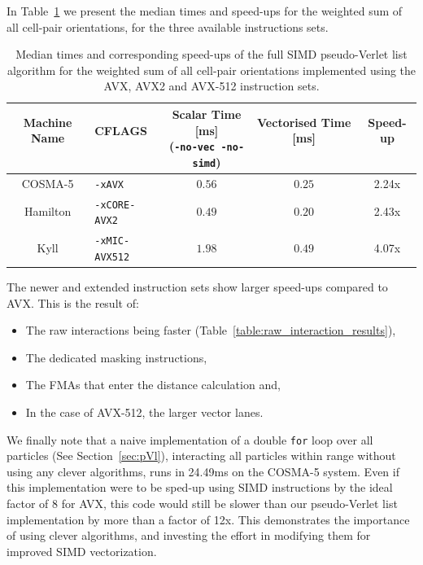 \documentclass{IOS-Book-Article}
\begin{document}
In Table~\ref{table:pseudo_verlet_list_simd_results} we present the median times and speed-ups for the weighted sum of all cell-pair orientations, for the three available instructions sets.

\begin{table}[h]
  \caption{Median times and corresponding speed-ups of the full SIMD pseudo-Verlet list algorithm for the weighted sum of all cell-pair orientations implemented using the AVX, AVX2 and AVX-512 instruction sets.}
  \label{table:pseudo_verlet_list_simd_results}
  \centering
  \begin{tabular}{ clccc } 
    \hline
    \hline
    \makecell{Machine Name\\~} & \makecell{CFLAGS\\~} & \makecell{Scalar Time [ms] \\ (\texttt{-no-vec -no-simd})} & \makecell{Vectorised Time [ms]\\~} & \makecell{Speed-up\\~} \\ 
    \hline
    COSMA-5 & \texttt{-xAVX}        & $0.56$ & $0.25$ & 2.24x \\
    Hamilton & \texttt{-xCORE-AVX2}  & $0.49$ & $0.20$ & 2.43x \\ 
    Kyll & \texttt{-xMIC-AVX512} & $1.98$ & $0.49$ & 4.07x \\ 
    \hline
    \hline
  \end{tabular}
\end{table}

The newer and extended instruction sets show larger speed-ups compared to AVX. This is the result of:

\begin{itemize}
	\item The raw interactions being faster (Table~\ref{table:raw_interaction_results}),
    \item The dedicated masking instructions,
    \item The FMAs that enter the distance calculation and, 
    \item In the case of AVX-512, the larger vector lanes.
\end{itemize}

We finally note that a naive implementation of a double {\tt for} loop over all particles (See Section~\ref{sec:pVl}), interacting all particles within range without using any clever algorithms, runs in 24.49ms  on the COSMA-5 system. Even if this implementation were to be sped-up using SIMD instructions by the ideal factor of 8 for AVX, this code would still be slower than our pseudo-Verlet list implementation by more than a factor of 12x. This demonstrates the importance of using clever algorithms, and investing the effort in modifying them for improved SIMD vectorization.
\end{document}
